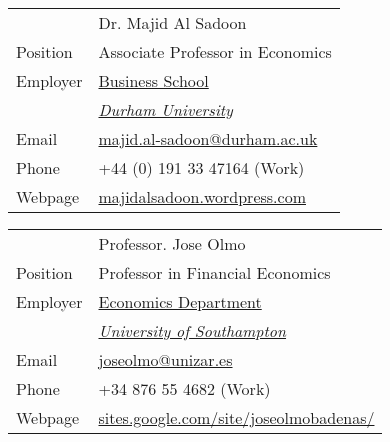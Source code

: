 \documentclass[margin,line,pifont,palatino,courier]{res}
\begin{document}
\begin{resume}
\begin{tabular}{@{}p{0.8in}p{4in}}
& Dr. Majid Al Sadoon\\
Position&Associate Professor in Economics\\
Employer&\href{https://www.dur.ac.uk/business/}{Business School}\\
&\href{https://www.dur.ac.uk/}{\textit{Durham University}}\\
Email & \href{mailto:majid.al-sadoon@durham.ac.uk}{majid.al-sadoon@durham.ac.uk}\\
Phone &+44 (0) 191 33 47164 (Work)\\
Webpage&\href{https://majidalsadoon.wordpress.com/}{majidalsadoon.wordpress.com}
\end{tabular}


\begin{tabular}{@{}p{0.8in}p{4in}}
& Professor. Jose Olmo\\
Position&Professor in Financial Economics\\
Employer&\href{https://www.southampton.ac.uk/economics/}{Economics Department}\\
&\href{https://www.southampton.ac.uk/}{\textit{University of Southampton}}\\
Email & \href{mailto: joseolmo@unizar.es}{ joseolmo@unizar.es}\\
Phone &+34 876 55 4682 (Work)\\
Webpage&\href{https://sites.google.com/site/joseolmobadenas/}{sites.google.com/site/joseolmobadenas/}
\end{tabular}



\end{resume}
\end{document}
